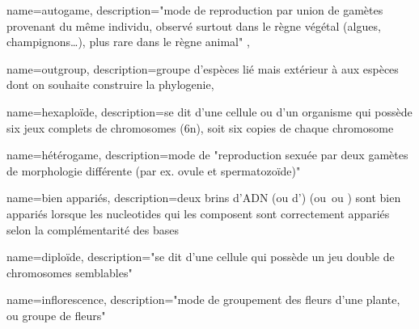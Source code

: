 






 {
    name={autogame},
    description={"mode de reproduction par union de gamètes provenant du même individu, observé surtout dans le règne végétal (algues, champignons…), plus rare dans le règne animal" \cite{Robert}},
}

 {
    name={outgroup},
    description={groupe d'espèces lié mais extérieur à aux espèces dont on souhaite construire la \gls{phylogenie}},
}

% 
 {
    name={hexaploïde},
    description={se dit d'une cellule ou d'un organisme qui possède six jeux complets de chromosomes (6n), soit six copies de chaque chromosome}
}
 
 {
    name={hétérogame},
    description={mode de "reproduction sexuée par deux gamètes de morphologie différente (par ex. ovule et spermatozoïde)" \cite{Robert}}
}

 {
    name={bien appariés},
    description={deux brins d'ADN (ou d'\ARN) (ou \reads\,ou \contigs) sont bien appariés lorsque les \glspl{nucleotide} qui les composent sont correctement appariés selon la complémentarité des bases}
}


 {
    name=diploïde,
    description={"se dit d'une cellule qui possède un jeu double de chromosomes semblables" \cite{Robert}}
}

 {
    name=inflorescence,
    description={"mode de groupement des fleurs d'une plante, ou groupe de fleurs" \cite{LeDico}}
}

